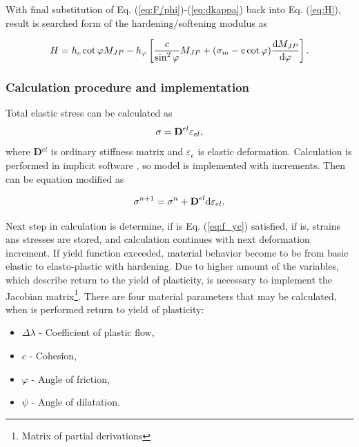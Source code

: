 With final substitution of Eq. (\ref{eq:F/phi})-(\ref{eq:dkappa}) back into Eq. (\ref{eq:H}), result is searched form of the hardening/softening modulus as

\begin{equation}\label{eq:H_final}
	H = h_c \cot\varphi M_{JP} - h_\varphi \left[ \dfrac{c}{\sin^2 \varphi} M_{JP} + (\sigma_m - c \cot \varphi) \dv{M_{JP}}{\varphi} \right].
\end{equation}


\subsubsection{Calculation procedure and implementation}\label{sec:drucker-prager_count}
\indent

Total elastic stress can be calculated as 
\begin{equation}\label{eq:f_sigma}
\sigma = \text{\textbf{D}}^{el} \varepsilon_{el},
\end{equation}
where \textbf{D}$^{el}$ is ordinary stiffness matrix and $\varepsilon_e$ is elastic deformation. Calculation is performed in  implicit software \cite{mars}, so model is implemented with increments. Then can be equation modified as

\begin{equation}\label{eq:f_sigma1}
	\sigma^{n+1} = \sigma^n+ \text{\textbf{D}}^{el} \mathrm{d} \varepsilon_{el}.
\end{equation}

Next step in calculation is determine, if is Eq. (\ref{eq:f_yc}) satisfied, if is, strains ans stresses are stored, and calculation continues with next deformation increment. If yield function exceeded, material behavior become to be from basic elastic to elasto-plastic with hardening. Due to higher amount of the variables, which describe return to the yield of plasticity, is necessary to implement the Jacobian matrix\footnote{Matrix of partial derivations}. There are four material parameters that may be calculated, when is performed return to yield of plasticity:

\begin{itemize}
	\item $\Delta\lambda$ - Coefficient of plastic flow,
	\item $c$ - Cohesion,
	\item  $\varphi$ - Angle of friction,
	\item $\psi$ - Angle of dilatation.
\end{itemize}

